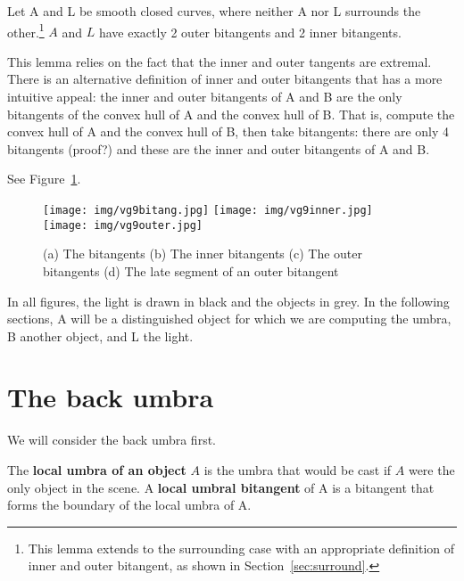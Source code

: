 \documentclass[9pt,twocolumn]{article}
\begin{document}
\begin{lemma}
Let A and L be smooth closed curves, where neither A nor L surrounds the
other.\footnote{This lemma extends to the surrounding case with an
	appropriate definition of inner and outer bitangent, as shown in
	Section~\ref{sec:surround}.}
$A$ and $L$ have exactly 2 outer bitangents and 2 inner bitangents.
\end{lemma}
\prf
This lemma relies on the fact that the inner and outer tangents are extremal.
There is an alternative definition of inner and outer bitangents
that has a more intuitive appeal: the inner and outer bitangents of A and B
are the only bitangents of the convex hull of A and the convex hull of B.
That is, compute the convex hull of A and the convex hull of B, then take
bitangents: there are only 4 bitangents (proof?) and these are the inner and
outer bitangents of A and B.
\QED

See Figure~\ref{fig:inout}.

\begin{figure}
\begin{center}
\texttt{[image: img/vg9bitang.jpg]}
\texttt{[image: img/vg9inner.jpg]}
\texttt{[image: img/vg9outer.jpg]}
\end{center}
\caption{(a) The bitangents
	 (b) The inner bitangents 
	 (c) The outer bitangents
	 (d) The late segment of an outer bitangent}
\label{fig:inout}
\end{figure}

In all figures, the light is drawn in black and the objects in grey.
In the following sections, A will be a distinguished object for which
we are computing the umbra, B another object, and L the light.


\clearpage

\section{The back umbra}
\label{sec:localumbra}

We will consider the back umbra first.

\begin{defn2}
The {\bf local umbra of an object} $A$ is the umbra that would be
cast if $A$ were the only object in the scene.
A {\bf local umbral bitangent} of A is a bitangent 
that forms the boundary of the local umbra of A.
\end{defn2}
\end{document}
